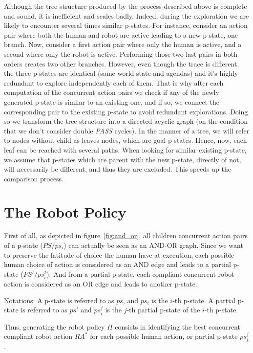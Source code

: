 Although the tree structure produced by the process described above is complete and sound, it is inefficient and scales badly. Indeed, during the exploration we are likely to encounter several times similar p-states. For instance, consider an action pair where both the human and robot are active leading to a new p-state, one branch. Now, consider a first action pair where only the human is active, and a second where only the robot is active. Performing those two last pairs in both orders creates two other branches. However, even though the trace is different, the three p-states are identical (same world state and agendas) and it's highly redundant to explore independently each of them. That is why after each computation of the concurrent action pairs we check if any of the newly generated p-state is similar to an existing one, and if so, we connect the corresponding pair to the existing p-state to avoid redundant explorations. Doing so we transform the tree structure into a directed acyclic graph (on the condition that we don't consider double \textit{PASS} cycles). In the manner of a tree, we will refer to nodes without child as leaves nodes, which are goal p-states. Hence, now, each leaf can be reached with several paths. 
When looking for similar existing p-state, we assume that p-states which are parent with the new p-state, directly of not, will necessarily be different, and thus they are excluded. This speeds up the comparison process. 



\section{The Robot Policy}

First of all, as depicted in figure~\ref{fig:and_or}, all children concurrent action pairs of a p-state ($PS / ps_i$) can actually be seen as an AND-OR graph. Since we want to preserve the latitude of choice the human have at execution, each possible human choice of action is considered as an AND edge and leads to a partial p-state ($PS' / ps_i^j$). And from a partial p-state, each compliant concurrent robot action is considered as an OR edge and leads to another p-state.

Notations: A p-state is referred to as $ps$, and $ps_i$ is the $i$-th p-state. A partial p-state is referred to as $ps'$ and $ps_i^j$ is the $j$-th partial p-state of the $i$-th p-state.

Thus, generating the robot policy $\Pi$ consists in identifying the best concurrent compliant robot action $RA^*$ for each possible human action, or partial p-state $ps_i^j$.

